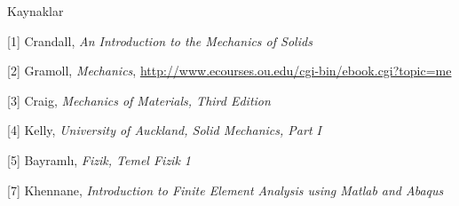 \documentclass[12pt,fleqn]{article}\usepackage{../../common}
\begin{document}
Kaynaklar

[1] Crandall, {\em An Introduction to the Mechanics of Solids}

[2] Gramoll, {\em Mechanics},
    \url{http://www.ecourses.ou.edu/cgi-bin/ebook.cgi?topic=me}

[3] Craig, {\em Mechanics of Materials, Third Edition}

[4] Kelly, {\em University of Auckland, Solid Mechanics, Part I}

[5] Bayramlı, {\em Fizik, Temel Fizik 1}

[7] Khennane, {\em Introduction to Finite Element Analysis using Matlab and Abaqus}
\end{document}
